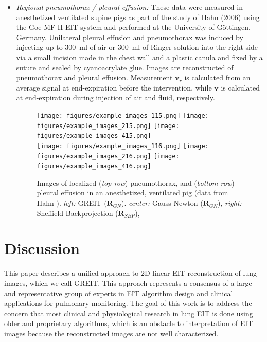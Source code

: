 \documentclass[12pt]{iopart}
\newcommand{\vB}{\mbox{$\mathbf{v}$}}
\newcommand{\RB}{\mbox{$\mathbf{R}$}}
\begin{document}
\begin{itemize}
\item
{\em Regional pneumothorax / pleural effusion:}
These data were measured in anesthetized
ventilated supine pigs as part of the
study of Hahn \etal (2006) using the
Goe MF II EIT system and performed at the
University of G\"ottingen, Germany.
Unilateral pleural effusion and pneumothorax was
induced by injecting up to $300$~ml of air or $300$~ml of
Ringer solution into the right side via a small incision
made in the chest wall and a plastic canula and
fixed by a suture and sealed by cyanoacrylate glue.
Images are reconstructed of pneumothorax
and pleural effusion.
Measurement $\vB_r$ is calculated from an
average signal at end-expiration before
the intervention, while $\vB$ is calculated
at end-expiration during injection of air
and fluid, respectively.

\begin{figure}[bhtp]
\begin{center}
\texttt{[image: figures/example\_images\_115.png]}
\texttt{[image: figures/example\_images\_215.png]}
\texttt{[image: figures/example\_images\_415.png]}
\\
\texttt{[image: figures/example\_images\_116.png]}
\texttt{[image: figures/example\_images\_216.png]}
\texttt{[image: figures/example\_images\_416.png]}
\caption{
\label{fig:Frerichs98images}
Images of localized
({\em top row})
pneumothorax, and
({\em bottom row})
pleural effusion
in an anesthetized, ventilated pig 
(data from Hahn ).
{\em left:} GREIT ($\RB_{GN}$).
{\em center:} Gauss-Newton ($\RB_{GN}$),
{\em right:} Sheffield Backprojection ($\RB_{SBP}$),
}
\end{center}
\end{figure}


\end{itemize}


\section{Discussion}

This paper describes a unified approach to 2D linear EIT
reconstruction of lung images, which we call GREIT.
This approach represents
a consensus of a large and representative
group of experts in EIT algorithm design and clinical
applications for pulmonary monitoring. The goal of
this work is to address the concern that most
clinical and physiological research in lung EIT
is done using older and proprietary algorithms, which is
an obstacle to interpretation of EIT images because the
reconstructed images are not well characterized.
\end{document}
